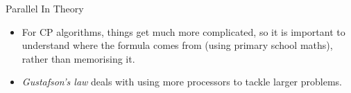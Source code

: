 \documentclass[aspectratio=169,compress,10pt]{beamer}
\begin{document}
\begin{frame}{Parallel In Theory}
{\begin{itemize}
            \item For CP algorithms, things get much more complicated, so it is important to understand
                where the formula comes from (using primary school maths), rather than memorising it.

            \item \emph{Gustafson's law} deals with using more processors to tackle larger problems.
        \end{itemize}
    }

\end{frame}
\end{document}

